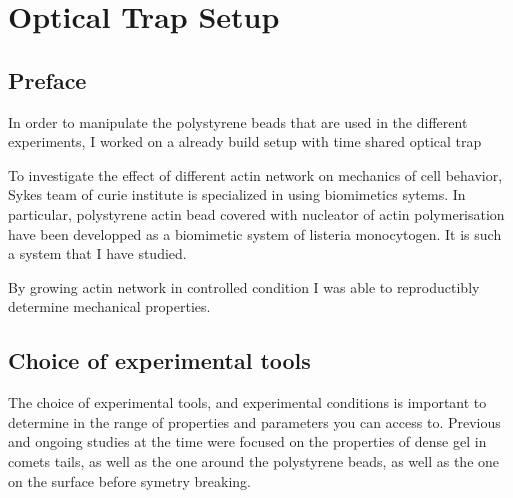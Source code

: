 \documentclass[A4paperpaper,11pt,english]{sphinxmanual}
\begin{document}
\chapter{Optical Trap Setup}
\label{parts/physicalparameters:physicalparameters}\label{parts/physicalparameters::doc}\label{parts/physicalparameters:optical-trap-setup}

\section{Preface}
\label{parts/physicalparameters:preface}
In order to manipulate the polystyrene beads that are used in the different
experiments, I worked on a already build setup with time shared optical trap

To investigate the effect of different actin network on mechanics of cell
behavior, Sykes team of curie institute is specialized in using biomimetics
sytems. In particular, polystyrene actin bead covered with nucleator of actin
polymerisation have been developped as a biomimetic system of listeria
monocytogen. It is such a system that I have studied.

By growing actin network in controlled condition I was able to reproductibly
determine mechanical properties.


\section{Choice of experimental tools}
\label{parts/physicalparameters:choice-of-experimental-tools}
The choice of experimental tools, and experimental conditions is important to
determine in the range of properties and parameters you can access to.
Previous and ongoing studies at the time were focused on the properties of dense
gel in comets tails, as well as the one around the polystyrene beads, as well as the one on the surface before symetry breaking.
\end{document}
